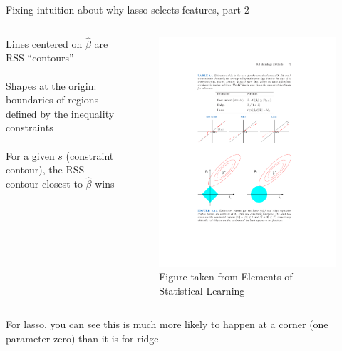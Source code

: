 \documentclass[mathserif]{beamer}
\begin{document}
\begin{frame}{Fixing intuition about why lasso selects features, part 2}
\begin{columns}
Lines centered on $\hat{\beta}$ are RSS ``contours'' \\~\\

Shapes at the origin: boundaries of regions defined by the inequality constraints \\~\\

For a given $s$ (constraint contour), the RSS contour closest to $\hat{\beta}$ wins\\~\\

\begin{figure}
\includegraphics[scale=0.7]{lasso_v_ridge}
\caption*{\tiny Figure taken from Elements of Statistical Learning}
\end{figure}
\end{columns}


For lasso, you can see this is much more likely to happen at a corner (one parameter zero) than it is for ridge

\end{frame}
\end{document}
